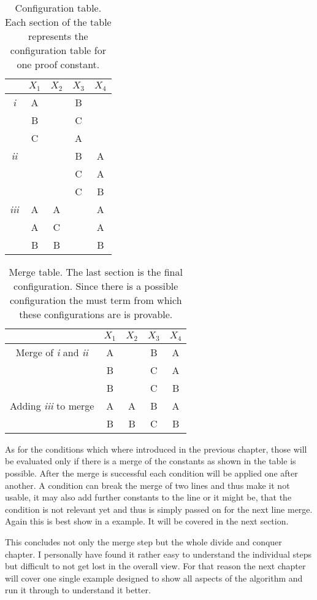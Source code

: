 \vspace{0.2cm}
\begin{table}[ht]
\centering
\begin{tabular}{ c c c c c }
	 & $X_1$ & $X_2$ & $X_3$ & $X_4$\\
 	\hline
 	\emph{i}  	& A 	& 		& B 	& \\
 				& B 	&		& C 	& \\
 				& C 	& 		& A 	& \\
 	\hline
 	\emph{ii}  	& 		&		& B 	& A\\
 				& 	 	&		& C 	& A\\
 				&		&		& C 	& B\\
  	\hline
  	\emph{iii}	& A 	& A 	& 		& A\\
 	  			& A 	& C 	& 		& A\\
 	  			& B 	& B		&		& B\\

 	\hline 
\end{tabular}
\caption{Configuration table. Each section of the table represents the configuration table for one proof constant.}
\end{table}

\vspace{0.2cm}
\begin{table}[ht]
\centering
\begin{tabular}{ c c c c c }
	 & $X_1$ & $X_2$ & $X_3$ & $X_4$\\
 	\hline
 	Merge of \emph{i} and \emph{ii}
 				& A 	& 	 	& B 	& A \\
 	  			& B 	& 	 	& C 	& A \\
 	  			& B 	& 	 	& C 	& B \\
 	\hline	  
 	Adding \emph{iii} to merge
 			  	& A 	& A		& B 	& A\\
 				& B 	& B		& C 	& B\\
 	\hline
 	\hline 
\end{tabular}
\caption{Merge table. The last section is the final configuration. Since there is a possible configuration the must term from which these configurations are is provable.}
\end{table}

As for the conditions which where introduced in the previous chapter, those will be evaluated only if there is a merge of the constants as shown in the table is possible. After the merge is successful each condition will be applied one after another. A condition can break the merge of two lines and thus make it not usable, it may also add further constants to the line or it might be, that the condition is not relevant yet and thus is simply passed on for the next line merge. Again this is best show in a example. It will be covered in the next section.

\par This concludes not only the merge step but the whole divide and conquer chapter. I personally have found it rather easy to understand the individual steps but difficult to not get lost in the overall view. For that reason the next chapter will cover one single example designed to show all aspects of the algorithm and run it through to understand it better.